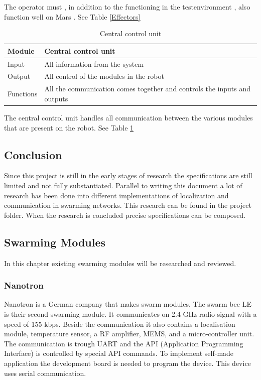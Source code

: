\documentclass[10pt,a4paper]{article}
\begin{document}
The operator must , in addition to the functioning in the testenvironment , also function well on Mars . See Table \ref{Effectors} \\

\begin{table}[H]
\centering
\caption{Central control unit}
\label{control}
\begin{tabular}{|l|l|}
\hline
Module    & Central control unit \\ \hline
Input  & All information from the system  \\ \hline
Output & All control of the modules in the robot \\ \hline
Functions  & All the communication comes together and controls the inputs and outputs            \\ \hline
\end{tabular}
\end{table}

The central control unit handles all communication between the various modules that are present on the robot. See Table \ref{control}

\subsection{Conclusion}
Since this project is still in the early stages of research the specifications are still limited and not fully substantiated. Parallel to writing this document a lot of research has been done into different implementations of localization and communication in swarming networks. This research can be found in the project folder. When the research is concluded precise specifications can be composed. 

\newpage
\subsection{Swarming Modules}

In this chapter existing swarming modules will be researched and reviewed.

\subsubsection{Nanotron}

Nanotron is a German company that makes swarm modules. The swarm bee LE is their second swarming module. It communicates on 2.4 GHz radio signal with a speed of 155 kbps. Beside the communication it also contains a localisation module, temperature sensor, a RF amplifier, MEMS, and a micro-controller unit. The communication is trough UART and the API (Application Programming Interface) is controlled by special API commands. To implement self-made application the development board is needed to program the device. This device uses serial communication. 
\end{document}
